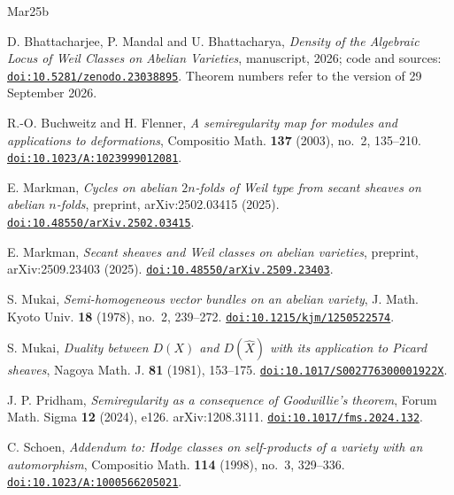 \documentclass[11pt]{amsart}
\theoremstyle{definition}
\theoremstyle{remark}
\begin{document}
\begin{thebibliography}{Mar25b}

D. Bhattacharjee, P. Mandal and U. Bhattacharya,
\emph{Density of the Algebraic Locus of Weil Classes on Abelian Varieties},
manuscript, 2026; code and sources:
\href{https://doi.org/10.5281/zenodo.23038895}{\texttt{doi:10.5281/zenodo.23038895}}.
Theorem numbers refer to the version of 29 September 2026.

R.-O. Buchweitz and H. Flenner,
\emph{A semiregularity map for modules and applications to deformations},
Compositio Math. \textbf{137} (2003), no.~2, 135--210.
\href{https://doi.org/10.1023/A:1023999012081}{\texttt{doi:10.1023/A:1023999012081}}.

E. Markman,
\emph{Cycles on abelian $2n$-folds of Weil type from secant sheaves on
abelian $n$-folds}, preprint, arXiv:2502.03415 (2025).
\href{https://doi.org/10.48550/arXiv.2502.03415}{\texttt{doi:10.48550/arXiv.2502.03415}}.

E. Markman,
\emph{Secant sheaves and Weil classes on abelian varieties},
preprint, arXiv:2509.23403 (2025).
\href{https://doi.org/10.48550/arXiv.2509.23403}{\texttt{doi:10.48550/arXiv.2509.23403}}.

S. Mukai,
\emph{Semi-homogeneous vector bundles on an abelian variety},
J. Math. Kyoto Univ. \textbf{18} (1978), no.~2, 239--272.
\href{https://doi.org/10.1215/kjm/1250522574}{\texttt{doi:10.1215/kjm/1250522574}}.

S. Mukai,
\emph{Duality between $D(X)$ and $D(\hat{X})$ with its application to Picard
sheaves},
Nagoya Math. J. \textbf{81} (1981), 153--175.
\href{https://doi.org/10.1017/S002776300001922X}{\texttt{doi:10.1017/S002776300001922X}}.

J. P. Pridham,
\emph{Semiregularity as a consequence of Goodwillie's theorem},
Forum Math. Sigma \textbf{12} (2024), e126. arXiv:1208.3111.
\href{https://doi.org/10.1017/fms.2024.132}{\texttt{doi:10.1017/fms.2024.132}}.

C. Schoen,
\emph{Addendum to: Hodge classes on self-products of a variety with an
automorphism},
Compositio Math. \textbf{114} (1998), no.~3, 329--336.
\href{https://doi.org/10.1023/A:1000566205021}{\texttt{doi:10.1023/A:1000566205021}}.

\end{thebibliography}
\end{document}
